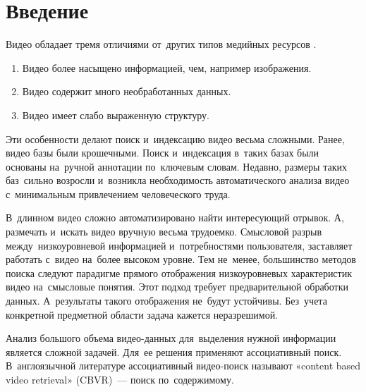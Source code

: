
%
%
%

\section{Введение}


\noindent
Видео обладает тремя отличиями от~других типов медийных
ресурсов \cite{Nabeel:2014}.
\begin{enumerate}
    \item Видео более насыщено информацией, чем, например изображения.
    \item Видео содержит много необработанных данных.
    \item Видео имеет слабо выраженную структуру.
\end{enumerate}
Эти особенности делают поиск и~индексацию видео весьма сложными.
Ранее, видео базы были крошечными.
Поиск и~индексация в~таких базах были основаны
на~ручной аннотации по~ключевым словам.
Недавно, размеры таких баз~сильно возросли
и~возникла необходимость автоматического анализа видео
с~минимальным привлечением человеческого труда.

В~длинном видео сложно автоматизировано найти интересующий отрывок.
А, размечать и~искать видео вручную весьма трудоемко.
Смысловой разрыв между~низкоуровневой информацией
и~потребностями пользователя, заставляет работать
с~видео на~более высоком уровне.
Тем не~менее, большинство методов поиска следуют парадигме
прямого отображения низкоуровневых характеристик видео
на~смысловые понятия.
Этот подход требует предварительной обработки данных.
А~результаты такого отображения не~будут устойчивы.
Без~учета конкретной предметной области задача кажется неразрешимой.

Анализ большого объема видео-данных для~выделения нужной
информации является сложной задачей.
Для~ее решения применяют ассоциативный поиск.
В~англоязычной литературе ассоциативный видео-поиск называют
«content based video retrieval» (CBVR)~— 
поиск по~содержимому.

